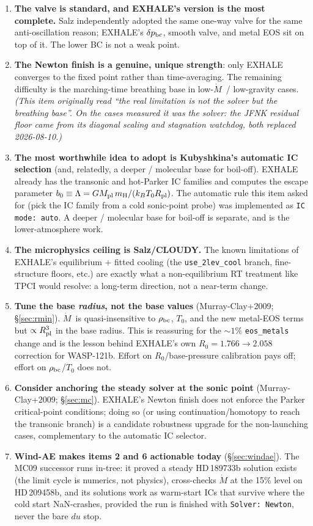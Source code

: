 \documentclass[english,a4paper]{my_memo}
\newcommand{\Mdot}{$\dot M$}
\begin{document}
\begin{enumerate}
\item \textbf{The valve is standard, and EXHALE's version is the most
  complete.} Salz independently adopted the same one-way valve for the
  same anti-oscillation reason; EXHALE's $\delta p_{\rm bc}$, smooth
  valve, and metal EOS sit on top of it. The lower BC is not a weak
  point.
\item \textbf{The Newton finish is a genuine, unique strength}: only
  EXHALE converges to the fixed point rather than time-averaging. The
  remaining difficulty is the marching-time breathing base in
  low-\Mdot\ / low-gravity cases. \emph{(This item originally read ``the
  real limitation is not the solver but the breathing base''. On the cases
  measured it was the solver: the JFNK residual floor came from its diagonal
  scaling and stagnation watchdog, both replaced 2026-08-10.)}
\item \textbf{The most worthwhile idea to adopt is Kubyshkina's
  automatic IC selection} (and, relatedly, a deeper / molecular base for
  boil-off). EXHALE already has the transonic and hot-Parker IC families
  and computes the escape parameter $b_0\equiv\Lambda = GM_{\rm pl}\,
  m_{\rm H}/(k_BT_0R_{\rm pl})$. The automatic rule this item asked for
  (pick the IC family from a cold sonic-point probe) was implemented as
  \texttt{IC mode: auto}. A deeper /
  molecular base for boil-off is separate, and is the lower-atmosphere work.
\item \textbf{The microphysics ceiling is Salz/CLOUDY.} The known
  limitations of EXHALE's equilibrium + fitted cooling (the
  \texttt{use\_2lev\_cool} branch, fine-structure floors, etc.) are exactly what a non-equilibrium RT
  treatment like TPCI would resolve: a long-term direction, not a
  near-term change.
\item \textbf{Tune the base \emph{radius}, not the base values}
  (Murray-Clay+2009; \S\ref{sec:rmin}). \Mdot\ is quasi-insensitive to
  $\rho_{\rm bc}$, $T_0$, and the new metal-EOS terms but
  $\propto R_{\rm pl}^3$ in the base radius. This is reassuring for the
  $\sim1\%$ \texttt{eos\_metals} change and is the lesson behind
  EXHALE's own $R_0=1.766\to2.058$ correction for WASP-121b. Effort on
  $R_0$/base-pressure calibration pays off; effort on $\rho_{\rm bc}$/$T_0$
  does not.
\item \textbf{Consider anchoring the steady solver at the sonic point}
  (Murray-Clay+2009; \S\ref{sec:mc}). EXHALE's Newton finish does not
  enforce the Parker critical-point conditions; doing so (or using
  continuation/homotopy to reach the transonic branch) is a candidate
  robustness upgrade for the non-launching cases, complementary to the
  automatic IC selector.
\item \textbf{Wind-AE makes items 2 and 6 actionable today}
  (\S\ref{sec:windae}). The MC09 successor runs in-tree: it proved a
  steady HD\,189733b solution exists (the limit cycle is numerics, not
  physics), cross-checks $\dot M$ at the 15\% level on HD\,209458b, and
  its solutions work as warm-start ICs that survive where the cold start
  NaN-crashes, provided the run is finished with
  \texttt{Solver: Newton}, never the bare $du$ stop.
\end{enumerate}
\end{document}
